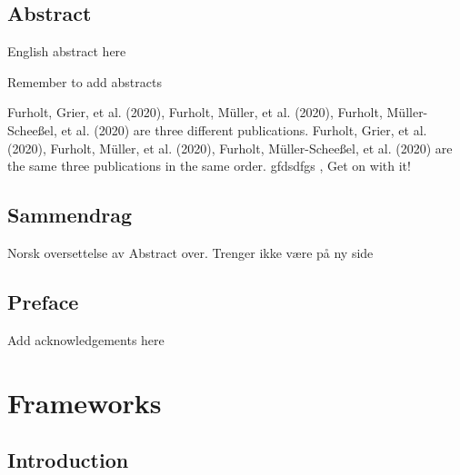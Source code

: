 \documentclass[
  12pt,
  a4paper, twoside]{book}
\author{}
\date{\vspace{-2.5em}}
\begin{document}
\begin{titlepage}

\newpage
\thispagestyle{empty}
\end{titlepage}

%

\hypertarget{abstract}{%
\chapter*{Abstract}\label{abstract}}

English abstract here

Remember to add abstracts

Furholt, Grier, et al. (2020), Furholt, Müller, et al. (2020), Furholt, Müller-Scheeßel, et al. (2020) are three different publications. Furholt, Grier, et al. (2020), Furholt, Müller, et al. (2020), Furholt, Müller-Scheeßel, et al. (2020) are the same three publications in the same order. gfdsdfgs , Get on with it!

\hypertarget{sammendrag}{%
\chapter*{Sammendrag}\label{sammendrag}}

Norsk oversettelse av Abstract over. Trenger ikke være på ny side

\hypertarget{preface}{%
\chapter*{Preface}\label{preface}}

Add acknowledgements here

\tableofcontents

\listoffigures

\listoftables

\mainmatter

\pagestyle{fancy}

\hypertarget{part-frameworks}{%
\part{Frameworks}\label{part-frameworks}}

\hypertarget{intro}{%
\chapter{Introduction}\label{intro}}
\end{document}
